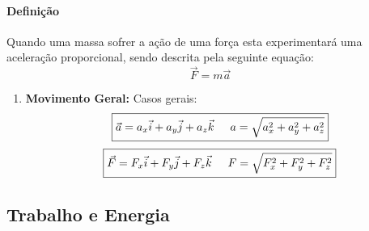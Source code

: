 \documentclass{article}
\begin{document}
            \paragraph{Definição}Quando uma massa sofrer a ação de uma força esta experimentará uma aceleração proporcional, sendo descrita pela seguinte equação:
                \begin{equation}
                    \boxed{
                        \vec{F} = m\vec{a}
                    }
                \end{equation}
                \begin{enumerate}[noitemsep]
                    \item \textbf{Movimento Geral:} Casos gerais:
                        \begin{equation}
                            \boxed{
                                \vec{a} = a_{x}\vec{i} + a_{y}\vec{j} + a_{z}\vec{k}
                                \hspace{5mm}
                                a = \sqrt{a_{x}^2 + a_{y}^2 + a_{z}^2}
                            }
                        \end{equation}
                        \begin{equation}
                            \boxed{
                                \vec{F} = F_{x}\vec{i} + F_{y}\vec{j} + F_{z}\vec{k}
                                \hspace{5mm}
                                F = \sqrt{F_{x}^2 + F_{y}^2 + F_{z}^2}
                            }
                        \end{equation}
                \end{enumerate}

        \subsection{Trabalho e Energia}
\end{document}
